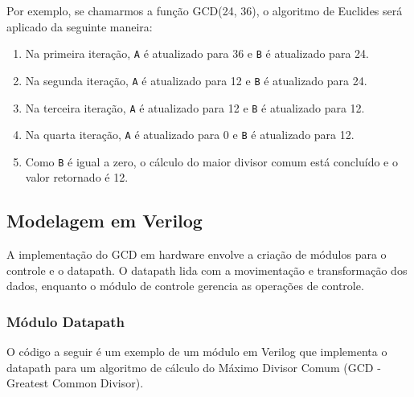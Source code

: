 \documentclass[a4paper,11pt]{article} %
\begin{document}
Por exemplo, se chamarmos a função GCD(24, 36), o algoritmo de Euclides será aplicado da seguinte maneira:

\begin{enumerate}
    \item Na primeira iteração, \texttt{A} é atualizado para 36 e \texttt{B} é atualizado para 24.
    \item Na segunda iteração, \texttt{A} é atualizado para 12 e \texttt{B} é atualizado para 24.
    \item Na terceira iteração, \texttt{A} é atualizado para 12 e \texttt{B} é atualizado para 12.
    \item Na quarta iteração, \texttt{A} é atualizado para 0 e \texttt{B} é atualizado para 12.
    \item Como \texttt{B} é igual a zero, o cálculo do maior divisor comum está concluído e o valor retornado é 12.
\end{enumerate}

\subsection{Modelagem em Verilog}

A implementação do GCD em hardware envolve a
criação de módulos para o controle e o datapath.
O datapath lida com a movimentação e transformação dos dados,
enquanto o módulo de controle gerencia as operações de controle.

\subsubsection{Módulo Datapath}

O código a seguir é um exemplo de um módulo em Verilog
que implementa o datapath para um algoritmo de cálculo do
Máximo Divisor Comum (GCD - Greatest Common Divisor).
\end{document}
